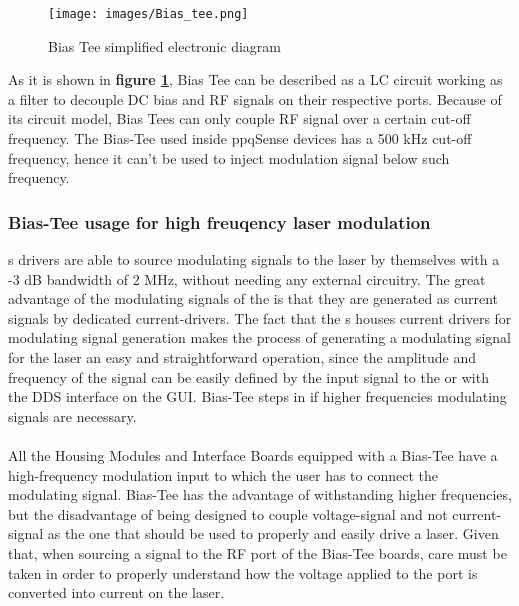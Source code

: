 \begin{figure}[H]
    \centering
    \texttt{[image: images/Bias\_tee.png]}
    \caption{Bias Tee simplified electronic diagram}
    \label{bias_tee_scheme}
\end{figure}

As it is shown in \textbf{figure \ref{bias_tee_scheme}}, Bias Tee can be described as a LC circuit working as a filter to decouple DC bias and RF signals on their respective ports.
Because of its circuit model, Bias Tees can only couple RF signal over a certain cut-off frequency.
\newline The Bias-Tee used inside ppqSense devices has a 500 kHz cut-off frequency, hence it can't be used to inject modulation signal below such frequency.





\subsubsection{Bias-Tee usage for high freuqency laser modulation}
\QubeModel s drivers are able to source modulating signals to the laser by themselves with a -3 dB bandwidth of 2 MHz, without needing any external circuitry. The great advantage of the modulating signals of the \QubeModel  is that they are generated as current signals by dedicated current-drivers.
The fact that the \QubeModel s houses current drivers for modulating signal generation makes the process of generating a modulating signal for the laser an easy and straightforward operation, since the amplitude and frequency of the signal can be easily defined by the input signal to the \QubeModel  or with the DDS interface on the GUI.
Bias-Tee steps in if higher frequencies modulating signals are necessary.

\paragraph{} All the Housing Modules and Interface Boards equipped with a Bias-Tee have a high-frequency modulation input to which the user has to connect the modulating signal.
\newline Bias-Tee has the advantage of withstanding higher frequencies, but the disadvantage of being designed to couple voltage-signal and not current-signal as the one that should be used to properly and easily drive a laser. Given that, when sourcing a signal to the RF port of the Bias-Tee boards, care must be taken in order to properly understand how the voltage applied to the port is converted into current on the laser.

